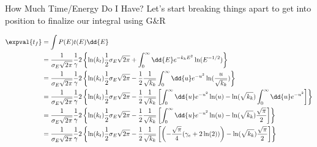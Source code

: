 \begin{answer}
\begin{answerpart}{How Much Time/Energy Do I Have?}
    Let's start breaking things apart to get into position to finalize
    our integral using G\&R

    \begin{equation}
      \begin{alignedat}{2}
        &&\expval{t_f}
        &= \int P(E)t(E) \dd{E}\\
        &&&=
        \frac{1}{\sigma_E\sqrt{2\pi}}
        \frac{1}{\gamma}
        2
        \left\{
        \ln(k_t)
        \frac{1}{2}\sigma_E\sqrt{2\pi}
        +
        \int_{0}^{\infty}
        \dd{E}
        e^{-k_kE^2}
        \ln(E^{-1/2})
        \right\}
        \\
        &&&=
        \frac{1}{\sigma_E\sqrt{2\pi}}
        \frac{1}{\gamma}
        2
        \left\{
        \ln(k_t)
        \frac{1}{2}\sigma_E\sqrt{2\pi}
        -
        \frac{1}{2}
        \frac{1}{\sqrt{k_k}}
        \int_{0}^{\infty}
        \dd{u}
        e^{-u^2}
        \ln(\frac{u}{\sqrt{k_k}})
        \right\}
        \\
        &&&=
        \frac{1}{\sigma_E\sqrt{2\pi}}
        \frac{1}{\gamma}
        2
        \left\{
        \ln(k_t)
        \frac{1}{2}\sigma_E\sqrt{2\pi}
        -
        \frac{1}{2}
        \frac{1}{\sqrt{k_k}}
        \left[
        \int_{0}^{\infty}
        \dd{u}
        e^{-u^2}
        \ln(u)
        -
        \ln(\sqrt{k_k})
        \int_{0}^{\infty}
        \dd{u}
        e^{-u^2}
        \right]
        \right\}
        \\
        &&&=
        \frac{1}{\sigma_E\sqrt{2\pi}}
        \frac{1}{\gamma}
        2
        \left\{
        \ln(k_t)
        \frac{1}{2}\sigma_E\sqrt{2\pi}
        -
        \frac{1}{2}
        \frac{1}{\sqrt{k_k}}
        \left[
        \int_{0}^{\infty}
        \dd{u}
        e^{-u^2}
        \ln(u)
        -
        \ln(\sqrt{k_k})
        \frac{\sqrt{\pi}}{2}
        \right]
        \right\}
        \\
        &&&=
        \frac{1}{\sigma_E\sqrt{2\pi}}
        \frac{1}{\gamma}
        2
        \left\{
        \ln(k_t)
        \frac{1}{2}\sigma_E\sqrt{2\pi}
        -
        \frac{1}{2}
        \frac{1}{\sqrt{k_k}}
        \left[
          \left(
          -\frac{\sqrt{\pi}}{4}(\gamma_e + 2\ln(2))
          \right)
        -
        \ln(\sqrt{k_k})
        \frac{\sqrt{\pi}}{2}
        \right]
        \right\}
        \\
      \end{alignedat}
    \end{equation}


\end{answerpart}
\end{answer}
